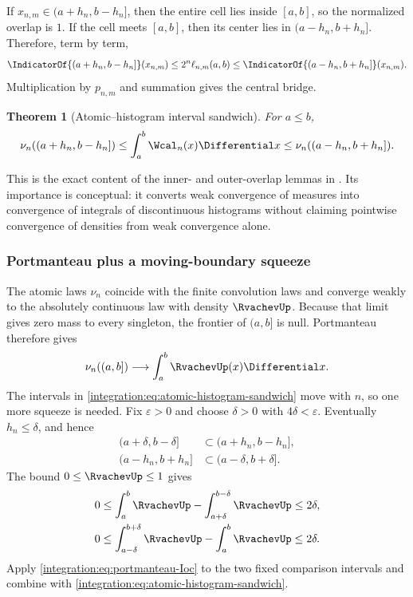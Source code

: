 \documentclass[11pt,oneside]{article}
\newtheorem{theorem}{Theorem}[section]
\theoremstyle{definition}
\theoremstyle{remark}
\begin{document}
If $x_{n,m}\in(a+h_n,b-h_n]$, then the entire cell lies inside $[a,b]$, so the normalized
overlap is $1$.  If the cell meets $[a,b]$, then its center lies in
$(a-h_n,b+h_n]$.  Therefore, term by term,
\begin{equation}
 \IndicatorOf{(a+h_n,b-h_n]}(x_{n,m})
 \le2^n\ell_{n,m}(a,b)
 \le\IndicatorOf{(a-h_n,b+h_n]}(x_{n,m}).
 \label{integration:eq:overlap-indicator-sandwich}
\end{equation}
Multiplication by $p_{n,m}$ and summation gives the central bridge.

\begin{theorem}[Atomic--histogram interval sandwich]
\label{integration:thm:atomic-histogram-sandwich}
For $a\le b$,
\begin{equation}
 \nu_n((a+h_n,b-h_n])
 \le\int_a^b\Wcal_n(x)\Differential x
 \le\nu_n((a-h_n,b+h_n]).
 \label{integration:eq:atomic-histogram-sandwich}
\end{equation}
\end{theorem}

This is the exact content of the inner- and outer-overlap lemmas in
.  Its importance is conceptual: it converts weak convergence
of measures into convergence of integrals of discontinuous histograms without claiming
pointwise convergence of densities from weak convergence alone.

\subsubsection{Portmanteau plus a moving-boundary squeeze}

The atomic laws $\nu_n$ coincide with the finite convolution laws and converge weakly to the
absolutely continuous law with density $\RvachevUp$.  Because that limit gives zero mass to every
singleton, the frontier of $(a,b]$ is null.  Portmanteau therefore gives
\begin{equation}
 \nu_n((a,b])\longrightarrow\int_a^b\RvachevUp(x)\Differential x.
 \label{integration:eq:portmanteau-Ioc}
\end{equation}
The intervals in \eqref{integration:eq:atomic-histogram-sandwich} move with $n$, so one more squeeze is
needed.  Fix $\varepsilon>0$ and choose $\delta>0$ with $4\delta<\varepsilon$.  Eventually
$h_n\le\delta$, and hence
\begin{align}
 (a+\delta,b-\delta]&\subset(a+h_n,b-h_n],                 \label{integration:eq:fixed-inner-subset}\\
 (a-h_n,b+h_n]&\subset(a-\delta,b+\delta].                 \label{integration:eq:moving-outer-subset}
\end{align}
The bound $0\le\RvachevUp\le1$ gives
\begin{align}
 0&\le\int_a^b\RvachevUp-\int_{a+\delta}^{b-\delta}\RvachevUp\le2\delta, \label{integration:eq:up-shrink-error}\\
 0&\le\int_{a-\delta}^{b+\delta}\RvachevUp-\int_a^b\RvachevUp\le2\delta. \label{integration:eq:up-expand-error}
\end{align}
Apply \eqref{integration:eq:portmanteau-Ioc} to the two fixed comparison intervals and combine with
\eqref{integration:eq:atomic-histogram-sandwich}.
\end{document}
